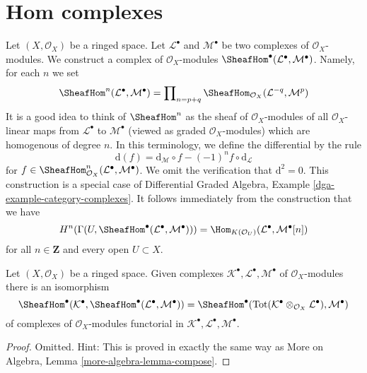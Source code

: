 \section{Hom complexes}
\label{section-hom-complexes}

\noindent
Let $(X, \mathcal{O}_X)$ be a ringed space. Let
$\mathcal{L}^\bullet$ and $\mathcal{M}^\bullet$ be two complexes
of $\mathcal{O}_X$-modules. We construct a complex
of $\mathcal{O}_X$-modules
$\SheafHom^\bullet(\mathcal{L}^\bullet, \mathcal{M}^\bullet)$.
Namely, for each $n$ we set
$$
\SheafHom^n(\mathcal{L}^\bullet, \mathcal{M}^\bullet) =
\prod\nolimits_{n = p + q}
\SheafHom_{\mathcal{O}_X}(\mathcal{L}^{-q}, \mathcal{M}^p)
$$
It is a good idea to think of $\SheafHom^n$ as the
sheaf of $\mathcal{O}_X$-modules of all $\mathcal{O}_X$-linear
maps from $\mathcal{L}^\bullet$ to $\mathcal{M}^\bullet$
(viewed as graded $\mathcal{O}_X$-modules) which are homogenous
of degree $n$. In this terminology, we define the differential by the rule
$$
\text{d}(f) =
\text{d}_\mathcal{M} \circ f - (-1)^n f \circ \text{d}_\mathcal{L}
$$
for
$f \in \SheafHom^n_{\mathcal{O}_X}(\mathcal{L}^\bullet, \mathcal{M}^\bullet)$.
We omit the verification that $\text{d}^2 = 0$.
This construction is a special case of
Differential Graded Algebra, Example \ref{dga-example-category-complexes}.
It follows immediately from the construction that we have
\begin{equation}
\label{equation-cohomology-hom-complex}
H^n(\Gamma(U, \SheafHom^\bullet(\mathcal{L}^\bullet, \mathcal{M}^\bullet))) =
\Hom_{K(\mathcal{O}_U)}(\mathcal{L}^\bullet, \mathcal{M}^\bullet[n])
\end{equation}
for all $n \in \mathbf{Z}$ and every open $U \subset X$.

\begin{lemma}
\label{lemma-compose}
Let $(X, \mathcal{O}_X)$ be a ringed space.
Given complexes $\mathcal{K}^\bullet, \mathcal{L}^\bullet, \mathcal{M}^\bullet$
of $\mathcal{O}_X$-modules there is an isomorphism
$$
\SheafHom^\bullet(\mathcal{K}^\bullet,
\SheafHom^\bullet(\mathcal{L}^\bullet, \mathcal{M}^\bullet))
=
\SheafHom^\bullet(\text{Tot}(\mathcal{K}^\bullet \otimes_{\mathcal{O}_X}
\mathcal{L}^\bullet), \mathcal{M}^\bullet)
$$
of complexes of $\mathcal{O}_X$-modules functorial in
$\mathcal{K}^\bullet, \mathcal{L}^\bullet, \mathcal{M}^\bullet$.
\end{lemma}

\begin{proof}
Omitted. Hint: This is proved in exactly the same way as
More on Algebra, Lemma \ref{more-algebra-lemma-compose}.
\end{proof}

